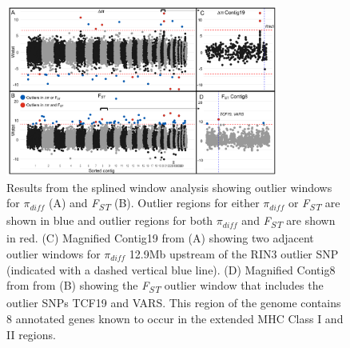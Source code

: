 \documentclass[9pt,twocolumn,twoside,lineno]{pnas-new}
\begin{document}
\newpage

\begin{figure}

{\centering \includegraphics[width=0.8\textwidth]{figures/splinewindow_manhattan.png}

}

\caption{\label{fig-spline-manhattan}Results from the splined window
analysis showing outlier windows for \(\pi_{diff}\) (A) and
\emph{F\textsubscript{ST}} (B). Outlier regions for either
\(\pi_{diff}\) or \emph{F\textsubscript{ST}} are shown in blue and
outlier regions for both \(\pi_{diff}\) and \emph{F\textsubscript{ST}}
are shown in red. (C) Magnified Contig19 from (A) showing two adjacent
outlier windows for \(\pi_{diff}\) 12.9Mb upstream of the RIN3 outlier
SNP (indicated with a dashed vertical blue line). (D) Magnified Contig8
from from (B) showing the \emph{F\textsubscript{ST}} outlier window that
includes the outlier SNPs TCF19 and VARS. This region of the genome
contains 8 annotated genes known to occur in the extended MHC Class I
and II regions.}

\end{figure}

\newpage
\end{document}

